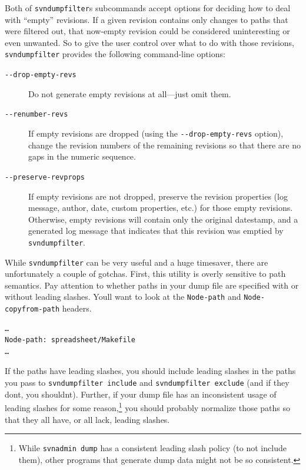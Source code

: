 Both of \texttt{svndumpfilter}\textquotesingle s subcommands accept
options for deciding how to deal with ``empty'' revisions. If a given
revision contains only changes to paths that were filtered out, that
now-empty revision could be considered uninteresting or even unwanted.
So to give the user control over what to do with those revisions,
\texttt{svndumpfilter} provides the following command-line options:

\begin{description}
\item[\texttt{-\/-drop-empty-revs}]
Do not generate empty revisions at all---just omit them.
\item[\texttt{-\/-renumber-revs}]
If empty revisions are dropped (using the \texttt{-\/-drop-empty-revs}
option), change the revision numbers of the remaining revisions so that
there are no gaps in the numeric sequence.
\item[\texttt{-\/-preserve-revprops}]
If empty revisions are not dropped, preserve the revision properties
(log message, author, date, custom properties, etc.) for those empty
revisions. Otherwise, empty revisions will contain only the original
datestamp, and a generated log message that indicates that this revision
was emptied by \texttt{svndumpfilter}.
\end{description}

While \texttt{svndumpfilter} can be very useful and a huge timesaver,
there are unfortunately a couple of gotchas. First, this utility is
overly sensitive to path semantics. Pay attention to whether paths in
your dump file are specified with or without leading slashes.
You\textquotesingle ll want to look at the \texttt{Node-path} and
\texttt{Node-copyfrom-path} headers.

\begin{verbatim}
…
Node-path: spreadsheet/Makefile
…
\end{verbatim}

If the paths have leading slashes, you should include leading slashes in
the paths you pass to \texttt{svndumpfilter\ include} and
\texttt{svndumpfilter\ exclude} (and if they don\textquotesingle t, you
shouldn\textquotesingle t). Further, if your dump file has an
inconsistent usage of leading slashes for some reason,\footnote{While
  \texttt{svnadmin\ dump} has a consistent leading slash policy (to not
  include them), other programs that generate dump data might not be so
  consistent.} you should probably normalize those paths so that they
all have, or all lack, leading slashes.

